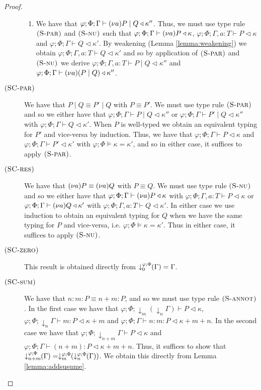 \begin{lemma}
\begin{proof}
\begin{description}
\begin{enumerate}
    \item We have that $\varphi;\Phi;\Gamma\vdash \newvar{a}{P} \mid Q \triangleleft \kappa''$. Thus, we must use type rule $\runa{S-par}$ and $\runa{S-nu}$ such that $\varphi;\Phi;\Gamma\vdash \newvar{a}{P} \triangleleft \kappa$, $\varphi;\Phi;\Gamma,a:T\vdash P \triangleleft \kappa$ and $\varphi;\Phi;\Gamma\vdash Q \triangleleft \kappa'$. By weakening (Lemma \ref{lemma:weakening}) we obtain $\varphi;\Phi;\Gamma,a:T\vdash Q \triangleleft \kappa'$ and so by application of $\runa{S-par}$ and $\runa{S-nu}$ we derive $\varphi;\Phi;\Gamma,a:T\vdash P \mid Q \triangleleft \kappa''$ and $\varphi;\Phi;\Gamma\vdash \newvar{a}{(P \mid Q)} \triangleleft \kappa''$.
\end{enumerate}
%
\item[$\runa{SC-par}$] We have that $P\mid Q \equiv P' \mid Q$ with $P\equiv P'$. We must use type rule $\runa{S-par}$ and so we either have that $\varphi;\Phi;\Gamma\vdash P \mid Q \triangleleft \kappa''$ or $\varphi;\Phi;\Gamma\vdash P' \mid Q \triangleleft \kappa''$ with $\varphi;\Phi;\Gamma\vdash Q \triangleleft \kappa'$. When $P$ is well-typed we obtain an equivalent typing for $P'$ and vice-versa by induction. Thus, we have that $\varphi;\Phi;\Gamma\vdash P \triangleleft \kappa$ and $\varphi;\Phi;\Gamma\vdash P' \triangleleft \kappa'$ with $\varphi;\Phi\vDash \kappa = \kappa'$, and so in either case, it suffices to apply $\runa{S-par}$.
%
\item[$\runa{SC-res}$] We have that $\newvar{a}{P} \equiv \newvar{a}{Q}$ with $P \equiv Q$. We must use type rule $\runa{S-nu}$ and so we either have that $\varphi;\Phi;\Gamma\vdash \newvar{a}{P} \triangleleft \kappa$ with $\varphi;\Phi;\Gamma,a:T\vdash P \triangleleft \kappa$ or $\varphi;\Phi;\Gamma\vdash \newvar{a}{Q} \triangleleft \kappa'$ with $\varphi;\Phi;\Gamma,a:T\vdash Q \triangleleft \kappa'$. In either case we use induction to obtain an equivalent typing for $Q$ when we have the same typing for $P$ and vice-versa, i.e. $\varphi;\Phi\vDash \kappa = \kappa'$. Thus in either case, it suffices to apply $\runa{S-nu}$.
%
\item[$\runa{SC-zero}$] This result is obtained directly from $\susume{\Gamma}{\varphi}{\Phi}{0}=\Gamma$.%
%
\item[$\runa{SC-sum}$] We have that $n : m : P \equiv n+m : P$, and so we must use type rule $\runa{S-annot}$. In the first case we have that $\varphi;\Phi;\downarrow_m\!\!(\downarrow_n\!\!\Gamma)\vdash P \triangleleft \kappa$, $\varphi;\Phi;\downarrow_n\!\!\Gamma\vdash m : P \triangleleft \kappa + m$ and $\varphi;\Phi;\Gamma\vdash n : m : P \triangleleft \kappa + m + n$. In the second case we have that $\varphi;\Phi;\downarrow_{n+m}\!\!\Gamma\vdash P \triangleleft \kappa$ and $\varphi;\Phi;\Gamma\vdash (n+m) : P \triangleleft \kappa + m + n$. Thus, it suffices to show that $\susume{\Gamma}{\varphi}{\Phi}{n+m} = \susume{\susume{\Gamma}{\varphi}{\Phi}{n}}{\varphi}{\Phi}{m}$. We obtain this directly from Lemma \ref{lemma:addsusume}.

\end{description}
\end{proof}
\end{lemma}
